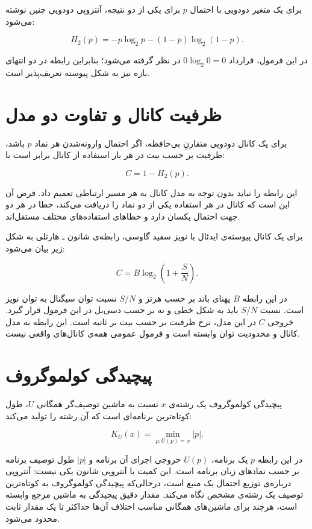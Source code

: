 برای یک متغیر دودویی با احتمال \(p\) برای یکی از دو نتیجه، آنتروپی دودویی چنین نوشته می‌شود:

\[
H_2(p)=-p\log_2 p-(1-p)\log_2(1-p).
\]

در این فرمول، قرارداد \(0\log_2 0=0\) در نظر گرفته می‌شود؛ بنابراین رابطه در دو انتهای بازه نیز به شکل پیوسته تعریف‌پذیر است.

\section{ظرفیت کانال و تفاوت دو مدل}

برای یک کانال دودویی متقارنِ بی‌حافظه، اگر احتمال وارونه‌شدن هر نماد \(p\) باشد، ظرفیت بر حسب بیت در هر بار استفاده از کانال برابر است با:

\[
C=1-H_2(p).
\]

این رابطه را نباید بدون توجه به مدل کانال به هر مسیر ارتباطی تعمیم داد. فرض آن این است که کانال در هر استفاده یکی از دو نماد را دریافت می‌کند، خطا در هر دو جهت احتمال یکسان دارد و خطاهای استفاده‌های مختلف مستقل‌اند.

برای یک کانال پیوسته‌ی ایدئال با نویز سفید گاوسی، رابطه‌ی شانون ـ هارتلی به شکل زیر بیان می‌شود:

\[
C=B\log_2\left(1+\frac{S}{N}\right).
\]

در این رابطه \(B\) پهنای باند بر حسب هرتز و \(S/N\) نسبت توان سیگنال به توان نویز است. نسبت \(S/N\) باید به شکل خطی و نه بر حسب دسی‌بل در این فرمول قرار گیرد. خروجی \(C\) در این مدل، نرخ ظرفیت بر حسب بیت بر ثانیه است. این رابطه به مدل کانال و محدودیت توان وابسته است و فرمول عمومی همه‌ی کانال‌های واقعی نیست.

\section{پیچیدگی کولموگروف}

پیچیدگی کولموگروف یک رشته‌ی \(x\) نسبت به ماشین توصیف‌گر همگانی \(U\)، طول کوتاه‌ترین برنامه‌ای است که آن رشته را تولید می‌کند:

\[
K_U(x)=\min_{p:U(p)=x}|p|.
\]

در این رابطه \(p\) یک برنامه، \(U(p)\) خروجی اجرای آن برنامه و \(|p|\) طول توصیف برنامه بر حسب نمادهای زبان برنامه است. این کمیت با آنتروپی شانون یکی نیست: آنتروپی درباره‌ی توزیع احتمال یک منبع است، درحالی‌که پیچیدگی کولموگروف به کوتاه‌ترین توصیف یک رشته‌ی مشخص نگاه می‌کند. مقدار دقیق پیچیدگی به ماشین مرجع وابسته است، هرچند برای ماشین‌های همگانی مناسب اختلاف آن‌ها حداکثر تا یک مقدار ثابت محدود می‌شود.

